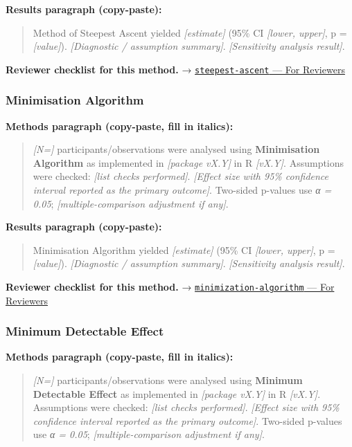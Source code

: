 \documentclass[
]{article}
\begin{document}
\textbf{Results paragraph (copy-paste):}

\begin{quote}
Method of Steepest Ascent yielded \emph{{[}estimate{]}} (95\% CI
\emph{{[}lower, upper{]}}, p = \emph{{[}value{]}}). \emph{{[}Diagnostic
/ assumption summary{]}}. \emph{{[}Sensitivity analysis result{]}}.
\end{quote}

\textbf{Reviewer checklist for this method.} →
\href{../chapters/16-design/steepest-ascent.Rmd\#for-reviewers}{\texttt{steepest-ascent}
--- For Reviewers}

\subsubsection{Minimisation Algorithm}\label{minimisation-algorithm}

\textbf{Methods paragraph (copy-paste, fill in italics):}

\begin{quote}
\emph{{[}N={]}} participants/observations were analysed using
\textbf{Minimisation Algorithm} as implemented in \emph{{[}package
vX.Y{]}} in R \emph{{[}vX.Y{]}}. Assumptions were checked: \emph{{[}list
checks performed{]}}. \emph{{[}Effect size with 95\% confidence interval
reported as the primary outcome{]}}. Two-sided p-values use \emph{α =
0.05}; \emph{{[}multiple-comparison adjustment if any{]}}.
\end{quote}

\textbf{Results paragraph (copy-paste):}

\begin{quote}
Minimisation Algorithm yielded \emph{{[}estimate{]}} (95\% CI
\emph{{[}lower, upper{]}}, p = \emph{{[}value{]}}). \emph{{[}Diagnostic
/ assumption summary{]}}. \emph{{[}Sensitivity analysis result{]}}.
\end{quote}

\textbf{Reviewer checklist for this method.} →
\href{../chapters/14-clinical/minimization-algorithm.Rmd\#for-reviewers}{\texttt{minimization-algorithm}
--- For Reviewers}

\subsubsection{Minimum Detectable
Effect}\label{minimum-detectable-effect}

\textbf{Methods paragraph (copy-paste, fill in italics):}

\begin{quote}
\emph{{[}N={]}} participants/observations were analysed using
\textbf{Minimum Detectable Effect} as implemented in \emph{{[}package
vX.Y{]}} in R \emph{{[}vX.Y{]}}. Assumptions were checked: \emph{{[}list
checks performed{]}}. \emph{{[}Effect size with 95\% confidence interval
reported as the primary outcome{]}}. Two-sided p-values use \emph{α =
0.05}; \emph{{[}multiple-comparison adjustment if any{]}}.
\end{quote}
\end{document}
